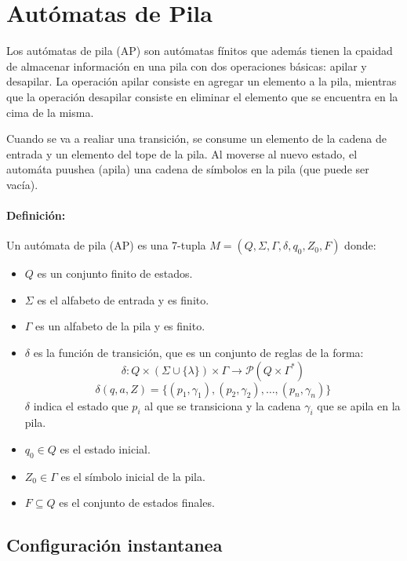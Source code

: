 \section{Autómatas de Pila}
\label{sec:automatas-pila}

Los autómatas de pila (AP) son autómatas fínitos que además tienen la cpaidad de almacenar información en una pila con dos operaciones básicas: apilar y desapilar. La operación apilar consiste en agregar un elemento a la pila, mientras que la operación desapilar consiste en eliminar el elemento que se encuentra en la cima de la misma.

Cuando se va a realiar una transición, se consume un elemento de la cadena de entrada y un elemento del tope de la pila. Al moverse al  nuevo estado, el automáta puushea (apila) una cadena de símbolos en la pila (que puede ser vacía).

\paragraph{Definición:} Un autómata de pila (AP) es una 7-tupla $M = (Q, \Sigma, \Gamma, \delta, q_0, Z_0, F)$ donde:

\begin{itemize}
  \item $Q$ es un conjunto finito de estados.
  \item $\Sigma$ es el alfabeto de entrada y es finito.
  \item $\Gamma$ es un alfabeto de la pila y es finito.
  \item $\delta$ es la función de transición, que es un conjunto de reglas de la forma:
        \[ \delta: Q \times (\Sigma\cup\{\lambda\}) \times \Gamma \rightarrow \mathcal{P}(Q\times\Gamma^*) \]
        \[ \delta(q, a, Z) = \{ (p_1, \gamma_1), (p_2, \gamma_2), \ldots, (p_n, \gamma_n) \} \]
        \(\delta\) indica el estado que \(p_i\) al que se transiciona y la cadena \(\gamma_i\) que se apila en la pila.
  \item $q_0 \in Q$ es el estado inicial.
  \item $Z_0 \in \Gamma$ es el símbolo inicial de la pila.
  \item $F\subseteq Q$ es el conjunto de estados finales.
\end{itemize}

\subsection{Configuración instantanea}
\label{subsec:configuracion-instantanea}

